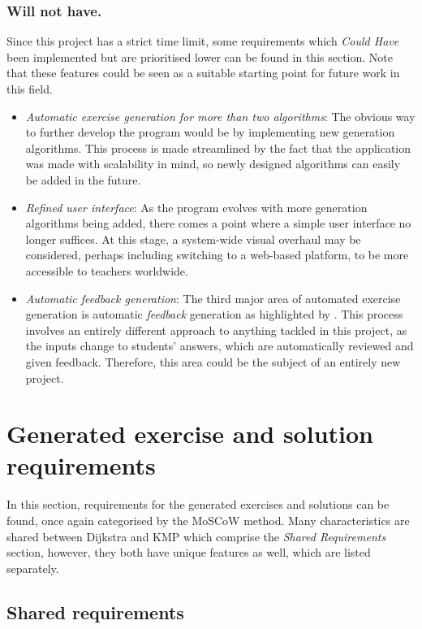 \documentclass{l4proj}
\begin{document}
\subsubsection{Will not have.}
Since this project has a strict time limit, some requirements which \emph{Could Have} been implemented but are prioritised lower can be found in this section. Note that these features could be seen as a suitable starting point for future work in this field.
\begin{itemize}
	\item
	\emph{Automatic exercise generation for more than two algorithms}: The obvious way to further develop the program would be by implementing new generation algorithms. This process is made streamlined by the fact that the application was made with scalability in mind, so newly designed algorithms can easily be added in the future.
	\item
	\emph{Refined user interface}: As the program evolves with more generation algorithms being added, there comes a point where a simple user interface no longer suffices. At this stage, a system-wide visual overhaul may be considered, perhaps including switching to a web-based platform, to be more accessible to teachers worldwide. 
	\item
	\emph{Automatic feedback generation}: The third major area of automated exercise generation is automatic \emph{feedback} generation as highlighted by \cite{Sad12}. This process involves an entirely different approach to anything tackled in this project, as the inputs change to students' answers, which are automatically reviewed and given feedback. Therefore, this area could be the subject of an entirely new project.
\end{itemize}

\section{Generated exercise and solution requirements}

In this section, requirements for the generated exercises and solutions can be found, once again categorised by the MoSCoW method. Many characteristics are shared between Dijkstra and KMP which comprise the \emph{Shared Requirements} section, however, they both have unique features as well, which are listed separately.

\subsection{Shared requirements}
\end{document}
